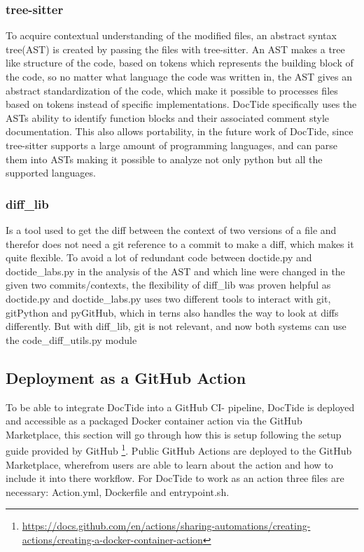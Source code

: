 \subsubsection*{tree-sitter}
\label{sec:tree-sitter}
To acquire contextual understanding of the modified files, an abstract syntax tree(AST) is created by passing the files with tree-sitter. An AST makes a tree like structure of the code, based on tokens which represents the building block of the code, so no matter what language the code was written in, the AST gives an abstract standardization of the code, which make it possible to processes files based on tokens instead of specific implementations. DocTide specifically uses the ASTs ability to identify function blocks and their associated comment style documentation. This also allows portability, in the future work of DocTide, since tree-sitter supports a large amount of programming languages, and can parse them into ASTs making it possible to analyze not only python but all the supported languages.

\subsubsection*{diff\_lib}
\label{sec:difflib}
Is a tool used to get the diff between the context of two versions of a file and therefor does not need a git reference to a commit to make a diff, which makes it quite flexible. To avoid a lot of redundant code between doctide.py and doctide\_labs.py in the analysis of the AST and which line were changed in the given two commits/contexts, the flexibility of diff\_lib was proven helpful as doctide.py and doctide\_labs.py uses two different tools to interact with git, gitPython and pyGitHub, which in terns also handles the way to look at diffs differently. But with diff\_lib, git is not relevant, and now both systems can use the code\_diff\_utils.py module

\subsection{Deployment as a GitHub Action}
To be able to integrate DocTide into a GitHub CI- pipeline, DocTide is deployed and accessible as a packaged Docker container action via the GitHub Marketplace, this section will go through how this is setup following the setup guide provided by GitHub \footnote{\url{https://docs.github.com/en/actions/sharing-automations/creating-actions/creating-a-docker-container-action}}. Public GitHub Actions are deployed to the GitHub Marketplace, wherefrom users are able to learn about the action and how to include it into there workflow. For DocTide to work as an action three files are necessary: Action.yml, Dockerfile and entrypoint.sh. 

